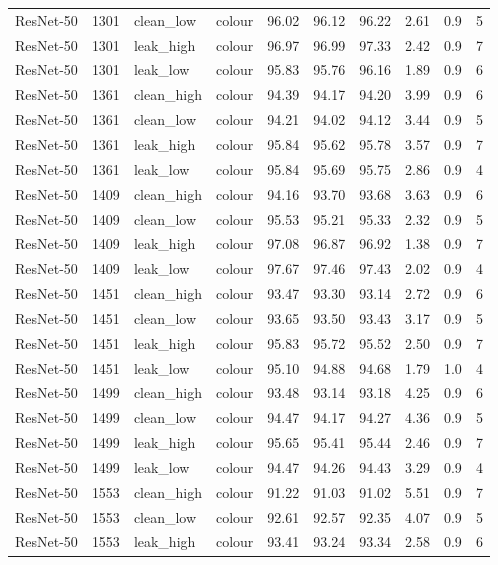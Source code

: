 {\begin{longtable}{lrllrrrrrr}
ResNet-50 & 1301 & clean\_low & colour & 96.02 & 96.12 & 96.22 & 2.61 & 0.9 & 5 \\
ResNet-50 & 1301 & leak\_high & colour & 96.97 & 96.99 & 97.33 & 2.42 & 0.9 & 7 \\
ResNet-50 & 1301 & leak\_low & colour & 95.83 & 95.76 & 96.16 & 1.89 & 0.9 & 6 \\
ResNet-50 & 1361 & clean\_high & colour & 94.39 & 94.17 & 94.20 & 3.99 & 0.9 & 6 \\
ResNet-50 & 1361 & clean\_low & colour & 94.21 & 94.02 & 94.12 & 3.44 & 0.9 & 5 \\
ResNet-50 & 1361 & leak\_high & colour & 95.84 & 95.62 & 95.78 & 3.57 & 0.9 & 7 \\
ResNet-50 & 1361 & leak\_low & colour & 95.84 & 95.69 & 95.75 & 2.86 & 0.9 & 4 \\
ResNet-50 & 1409 & clean\_high & colour & 94.16 & 93.70 & 93.68 & 3.63 & 0.9 & 6 \\
ResNet-50 & 1409 & clean\_low & colour & 95.53 & 95.21 & 95.33 & 2.32 & 0.9 & 5 \\
ResNet-50 & 1409 & leak\_high & colour & 97.08 & 96.87 & 96.92 & 1.38 & 0.9 & 7 \\
ResNet-50 & 1409 & leak\_low & colour & 97.67 & 97.46 & 97.43 & 2.02 & 0.9 & 4 \\
ResNet-50 & 1451 & clean\_high & colour & 93.47 & 93.30 & 93.14 & 2.72 & 0.9 & 6 \\
ResNet-50 & 1451 & clean\_low & colour & 93.65 & 93.50 & 93.43 & 3.17 & 0.9 & 5 \\
ResNet-50 & 1451 & leak\_high & colour & 95.83 & 95.72 & 95.52 & 2.50 & 0.9 & 7 \\
ResNet-50 & 1451 & leak\_low & colour & 95.10 & 94.88 & 94.68 & 1.79 & 1.0 & 4 \\
ResNet-50 & 1499 & clean\_high & colour & 93.48 & 93.14 & 93.18 & 4.25 & 0.9 & 6 \\
ResNet-50 & 1499 & clean\_low & colour & 94.47 & 94.17 & 94.27 & 4.36 & 0.9 & 5 \\
ResNet-50 & 1499 & leak\_high & colour & 95.65 & 95.41 & 95.44 & 2.46 & 0.9 & 7 \\
ResNet-50 & 1499 & leak\_low & colour & 94.47 & 94.26 & 94.43 & 3.29 & 0.9 & 4 \\
ResNet-50 & 1553 & clean\_high & colour & 91.22 & 91.03 & 91.02 & 5.51 & 0.9 & 7 \\
ResNet-50 & 1553 & clean\_low & colour & 92.61 & 92.57 & 92.35 & 4.07 & 0.9 & 5 \\
ResNet-50 & 1553 & leak\_high & colour & 93.41 & 93.24 & 93.34 & 2.58 & 0.9 & 6 \\

\end{longtable}}

